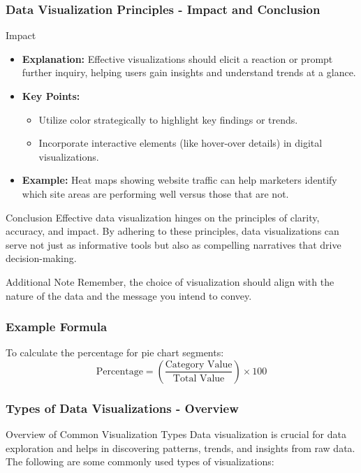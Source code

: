 \documentclass[aspectratio=169]{beamer}
\begin{document}
\begin{frame}[fragile]
    \frametitle{Data Visualization Principles - Impact and Conclusion}
    \begin{block}{Impact}
        \begin{itemize}
            \item \textbf{Explanation:} Effective visualizations should elicit a reaction or prompt further inquiry, helping users gain insights and understand trends at a glance.
            \item \textbf{Key Points:}
                \begin{itemize}
                    \item Utilize color strategically to highlight key findings or trends.
                    \item Incorporate interactive elements (like hover-over details) in digital visualizations.
                \end{itemize}
            \item \textbf{Example:} Heat maps showing website traffic can help marketers identify which site areas are performing well versus those that are not.
        \end{itemize}
    \end{block}

    \begin{block}{Conclusion}
        Effective data visualization hinges on the principles of clarity, accuracy, and impact. 
        By adhering to these principles, data visualizations can serve not just as informative tools but also as compelling narratives that drive decision-making.
    \end{block}
    
    \begin{block}{Additional Note}
        Remember, the choice of visualization should align with the nature of the data and the message you intend to convey.
    \end{block}
\end{frame}

\begin{frame}[fragile]
    \frametitle{Example Formula}
    To calculate the percentage for pie chart segments:
    \begin{equation}
        \text{Percentage} = \left( \frac{\text{Category Value}}{\text{Total Value}} \right) \times 100
    \end{equation}
\end{frame}

\begin{frame}[fragile]
    \frametitle{Types of Data Visualizations - Overview}
    \begin{block}{Overview of Common Visualization Types}
        Data visualization is crucial for data exploration and helps in discovering patterns, trends, and insights from raw data. The following are some commonly used types of visualizations:
    \end{block}
\end{frame}
\end{document}
